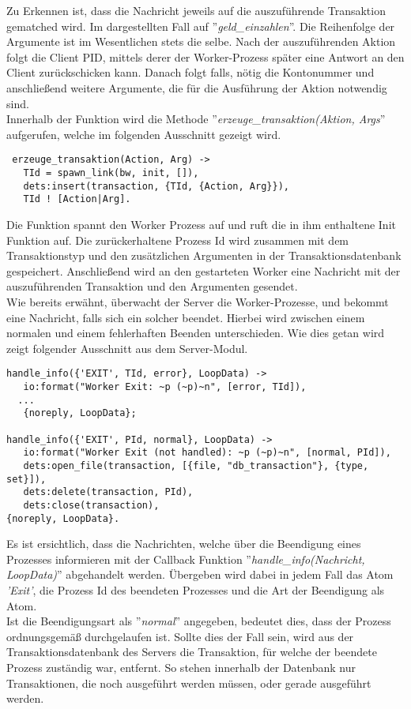 Zu Erkennen ist, dass die Nachricht jeweils auf die auszuführende Transaktion gematched wird. Im dargestellten Fall auf ''\textit{geld\_einzahlen}''. Die Reihenfolge der Argumente ist im Wesentlichen stets die selbe. Nach der auszuführenden Aktion folgt die Client PID, mittels derer der Worker-Prozess später eine Antwort an den Client zurückschicken kann. Danach folgt falls, nötig die Kontonummer und anschließend weitere Argumente, die für die Ausführung der Aktion notwendig sind.\\
Innerhalb der Funktion wird die Methode ''\textit{erzeuge\_transaktion(Aktion, Args}'' aufgerufen, welche im folgenden Ausschnitt gezeigt wird.
\begin{lstlisting}
 erzeuge_transaktion(Action, Arg) ->
   TId = spawn_link(bw, init, []),
   dets:insert(transaction, {TId, {Action, Arg}}),
   TId ! [Action|Arg].
\end{lstlisting}
Die Funktion spannt den Worker Prozess auf und ruft die in ihm enthaltene Init Funktion auf. Die zurückerhaltene Prozess Id wird zusammen mit dem Transaktionstyp und den zusätzlichen Argumenten in der Transaktionsdatenbank gespeichert. Anschließend wird an den gestarteten Worker eine Nachricht mit der auszuführenden Transaktion und den Argumenten gesendet.\\
Wie bereits erwähnt, überwacht der Server die Worker-Prozesse, und bekommt eine Nachricht, falls sich ein solcher beendet. Hierbei wird zwischen einem normalen und einem fehlerhaften Beenden unterschieden. Wie dies getan wird zeigt folgender Ausschnitt aus dem Server-Modul.
\begin{lstlisting}
handle_info({'EXIT', TId, error}, LoopData) -> 
   io:format("Worker Exit: ~p (~p)~n", [error, TId]),
  ...
   {noreply, LoopData};

handle_info({'EXIT', PId, normal}, LoopData) -> 
   io:format("Worker Exit (not handled): ~p (~p)~n", [normal, PId]),
   dets:open_file(transaction, [{file, "db_transaction"}, {type, set}]),
   dets:delete(transaction, PId),
   dets:close(transaction),
{noreply, LoopData}.
\end{lstlisting}
Es ist ersichtlich, dass die Nachrichten, welche über die Beendigung eines Prozesses informieren mit der Callback Funktion ''\textit{handle\_info(Nachricht, LoopData)}'' abgehandelt werden. Übergeben wird dabei in jedem Fall das Atom \textit{'Exit'}, die Prozess Id des beendeten Prozesses und die Art der Beendigung als Atom.\\
Ist die Beendigungsart als ''\textit{normal}'' angegeben, bedeutet dies, dass der Prozess ordnungsgemäß durchgelaufen ist. Sollte dies der Fall sein, wird aus der Transaktionsdatenbank des Servers die Transaktion, für welche der beendete Prozess zuständig war, entfernt. So stehen innerhalb der Datenbank nur Transaktionen, die noch ausgeführt werden müssen, oder gerade ausgeführt werden.\\
